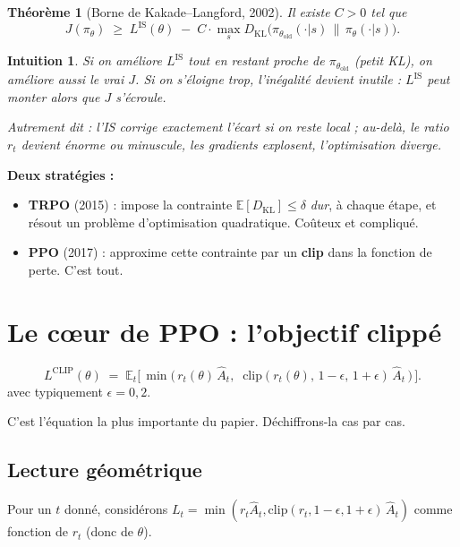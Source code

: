\documentclass[a4paper,11pt]{article}
\theoremstyle{clean}
\newtheorem*{thm}{Théorème}
\newtheorem*{intu}{Intuition}
\newcommand{\E}{\mathbb{E}}
\newcommand{\piT}{\pi_{\theta}}
\newcommand{\piOld}{\pi_{\theta_{\text{old}}}}
\begin{document}
\begin{thm}[Borne de Kakade--Langford, 2002]
Il existe $C>0$ tel que
\[
J(\piT) \;\geq\; L^{\mathrm{IS}}(\theta) \;-\; C \cdot \max_s D_{\mathrm{KL}}\!\big(\piOld(\cdot|s) \,\|\, \piT(\cdot|s)\big).
\]
\end{thm}

\begin{intu}
Si on améliore $L^{\mathrm{IS}}$ \emph{tout en restant proche de $\piOld$} (petit KL), on améliore aussi le vrai $J$. Si on s'éloigne trop, l'inégalité devient inutile : $L^{\mathrm{IS}}$ peut monter alors que $J$ s'écroule.

Autrement dit : l'IS corrige exactement l'écart si on reste local ; au-delà, le ratio $r_t$ devient énorme ou minuscule, les gradients explosent, l'optimisation diverge.
\end{intu}

\textbf{Deux stratégies :}
\begin{itemize}[nosep,leftmargin=1.2em]
\item \textbf{TRPO} (2015) : impose la contrainte $\E[D_{\mathrm{KL}}] \leq \delta$ \emph{dur}, à chaque étape, et résout un problème d'optimisation quadratique. Coûteux et compliqué.
\item \textbf{PPO} (2017) : approxime cette contrainte par un \textbf{clip} dans la fonction de perte. C'est tout.
\end{itemize}

\section{Le c\oe{}ur de PPO : l'objectif clippé}

\begin{keybox}
\[
L^{\mathrm{CLIP}}(\theta) \;=\; \E_t\!\Big[\, \min\!\big(\, r_t(\theta)\, \hat A_t,\;\; \mathrm{clip}(r_t(\theta),\, 1-\epsilon,\, 1+\epsilon)\, \hat A_t \,\big) \,\Big].
\]
avec typiquement $\epsilon = 0{,}2$.
\end{keybox}

C'est l'équation la plus importante du papier. Déchiffrons-la cas par cas.

\subsection{Lecture géométrique}

Pour un $t$ donné, considérons $L_t = \min(r_t \hat A_t, \mathrm{clip}(r_t, 1-\epsilon, 1+\epsilon)\, \hat A_t)$ comme fonction de $r_t$ (donc de $\theta$).
\end{document}
